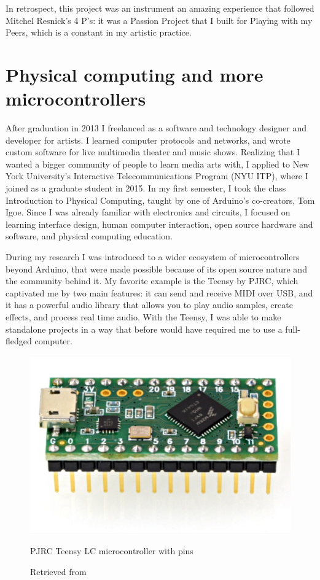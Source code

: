 In retrospect, this project was an instrument an amazing experience that followed Mitchel Resnick's 4 P's: it was a Passion Project that I built for Playing with my Peers, which is a constant in my artistic practice.

\section{Physical computing and more microcontrollers}

After graduation in 2013 I freelanced as a software and technology designer and developer for artists. I learned computer protocols and networks, and wrote custom software for live multimedia theater and music shows. Realizing that I wanted a bigger community of people to learn media arts with, I applied to New York University's Interactive Telecommunications Program (\acrshort{NYU} \acrshort{ITP}), where I joined as a graduate student in 2015. In my first semester, I took the class Introduction to Physical Computing, taught by one of Arduino's co-creators, Tom Igoe. Since I was already familiar with electronics and circuits, I focused on learning interface design, human computer interaction, open source hardware and software, and physical computing education.

During my research I was introduced to a wider ecosystem of microcontrollers beyond Arduino, that were made possible because of its open source nature and the community behind it. My favorite example is the Teensy by PJRC, which captivated me by two main features: it can send and receive \acrshort{MIDI} over USB, and it has a powerful audio library that allows you to play audio samples, create effects, and process real time audio. With the Teensy, I was able to make standalone projects in a way that before would have required me to use a full-fledged computer.

\begin{figure}[ht]
  \centering
  \includegraphics[width=0.75\linewidth,height=0.25\textheight,keepaspectratio]{images/pjrc-teensy-lc-with-pins.jpg}
  \caption{PJRC Teensy LC microcontroller with pins}
  \caption*{Retrieved from \cite{website-pjrc-teensy-lc-with-pins}}
  \label{fig:pjrc-teensy-lc-with-pins}
\end{figure}


